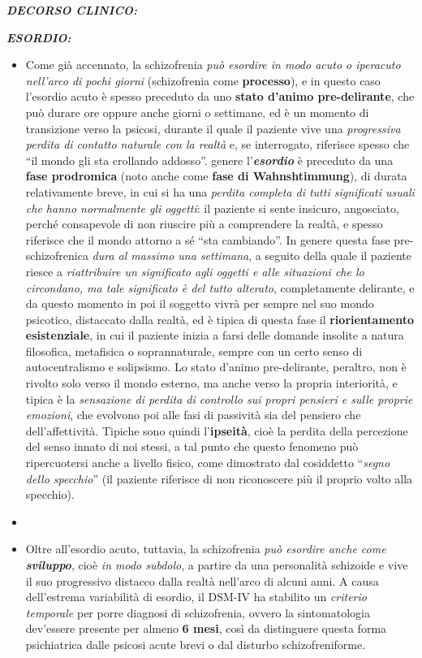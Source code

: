 \documentclass[]{article}
\begin{document}
\textbf{\emph{DECORSO CLINICO:}}

\textbf{\emph{ESORDIO:}}

\begin{itemize}
\item
  Come già accennato, la schizofrenia \emph{può esordire in modo acuto o
  iperacuto nell'arco di pochi giorni} (schizofrenia come
  \textbf{processo}), e in questo caso l'esordio acuto è spesso
  preceduto da uno \textbf{stato d'animo pre-delirante}, che può durare
  ore oppure anche giorni o settimane, ed è un momento di transizione
  verso la psicosi, durante il quale il paziente vive una
  \emph{progressiva perdita di contatto naturale con la realtà} e, se
  interrogato, riferisce spesso che ``il mondo gli sta crollando
  addosso''. genere l'\textbf{\emph{esordio}} è preceduto da una
  \textbf{fase prodromica} (noto anche come \textbf{fase di
  Wahnshtimmung}), di durata relativamente breve, in cui si ha una
  \emph{perdita completa di tutti significati usuali che hanno
  normalmente gli oggetti}: il paziente si sente insicuro, angosciato,
  perché consapevole di non riuscire più a comprendere la realtà, e
  spesso riferisce che il mondo attorno a sé ``sta cambiando''. In
  genere questa fase pre-schizofrenica \emph{dura al massimo una
  settimana}, a seguito della quale il paziente riesce a
  \emph{riattribuire un significato agli oggetti e alle situazioni che
  lo circondano, ma tale significato è del tutto alterato},
  completamente delirante, e da questo momento in poi il soggetto vivrà
  per sempre nel suo mondo psicotico, distaccato dalla realtà, ed è
  tipica di questa fase il \textbf{riorientamento}
  \textbf{esistenziale}, in cui il paziente inizia a farsi delle domande
  insolite a natura filosofica, metafisica o soprannaturale, sempre con
  un certo senso di autocentralismo e solipsismo. Lo stato d'animo
  pre-delirante, peraltro, non è rivolto solo verso il mondo esterno, ma
  anche verso la propria interiorità, e tipica è la \emph{sensazione di
  perdita di controllo sui propri pensieri e sulle proprie emozioni},
  che evolvono poi alle fasi di passività sia del pensiero che
  dell'affettività. Tipiche sono quindi l'\textbf{ipseità}, cioè la
  perdita della percezione del senso innato di noi stessi, a tal punto
  che questo fenomeno può ripercuotersi anche a livello fisico, come
  dimostrato dal cosiddetto ``\emph{segno dello specchio}'' (il paziente
  riferisce di non riconoscere più il proprio volto alla specchio).
\item
\item
  Oltre all'esordio acuto, tuttavia, la schizofrenia \emph{può esordire
  anche come \textbf{sviluppo}}, cioè \emph{in modo subdolo}, a partire
  da una personalità schizoide e vive il suo progressivo distacco dalla
  realtà nell'arco di alcuni anni. A causa dell'estrema variabilità di
  esordio, il DSM-IV ha stabilito un \emph{criterio temporale} per porre
  diagnosi di schizofrenia, ovvero la sintomatologia dev'essere presente
  per almeno \textbf{6 mesi}, così da distinguere questa forma
  psichiatrica dalle psicosi acute brevi o dal disturbo
  schizofreniforme.
\end{itemize}
\end{document}
